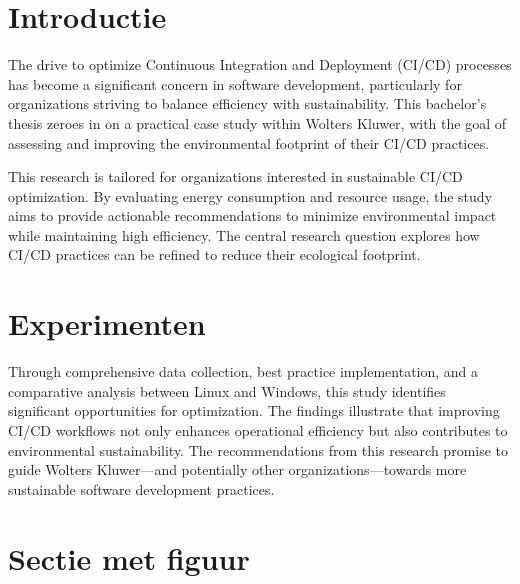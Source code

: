 \documentclass[a0,portrait]{hogent-poster}
\begin{document}
\begin{multicols}{2} %

\section{Introductie}

The drive to optimize Continuous Integration and Deployment (CI/CD) processes has become a significant concern in software development, particularly for organizations striving to balance efficiency with sustainability. This bachelor's thesis zeroes in on a practical case study within Wolters Kluwer, with the goal of assessing and improving the environmental footprint of their CI/CD practices.

This research is tailored for organizations interested in sustainable CI/CD optimization. By evaluating energy consumption and resource usage, the study aims to provide actionable recommendations to minimize environmental impact while maintaining high efficiency. The central research question explores how CI/CD practices can be refined to reduce their ecological footprint.

\section{Experimenten}
Through comprehensive data collection, best practice implementation, and a comparative analysis between Linux and Windows, this study identifies significant opportunities for optimization. The findings illustrate that improving CI/CD workflows not only enhances operational efficiency but also contributes to environmental sustainability. The recommendations from this research promise to guide Wolters Kluwer—and potentially other organizations—towards more sustainable software development practices.

\section{Sectie met figuur}



\end{multicols}
\end{document}
